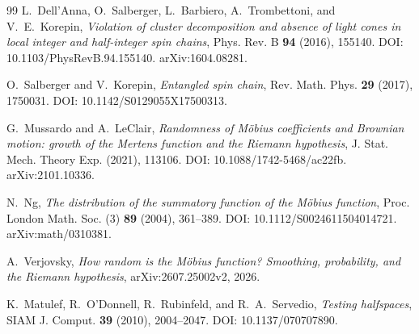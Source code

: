 \documentclass[11pt]{amsart}
\numberwithin{equation}{section}
\theoremstyle{plain}
\theoremstyle{definition}
\theoremstyle{remark}
\begin{document}
\begin{thebibliography}{99}
L.~Dell'Anna, O.~Salberger, L.~Barbiero, A.~Trombettoni, and V.~E.~Korepin,
\emph{Violation of cluster decomposition and absence of light cones in local integer and half-integer spin chains},
Phys. Rev. B \textbf{94} (2016), 155140.
DOI: 10.1103/PhysRevB.94.155140.
arXiv:1604.08281.

O.~Salberger and V.~Korepin,
\emph{Entangled spin chain},
Rev. Math. Phys. \textbf{29} (2017), 1750031.
DOI: 10.1142/S0129055X17500313.

G.~Mussardo and A.~LeClair,
\emph{Randomness of M\"obius coefficients and Brownian motion: growth of the Mertens function and the Riemann hypothesis},
J. Stat. Mech. Theory Exp. (2021), 113106.
DOI: 10.1088/1742-5468/ac22fb.
arXiv:2101.10336.

N.~Ng,
\emph{The distribution of the summatory function of the M\"obius function},
Proc. London Math. Soc. (3) \textbf{89} (2004), 361--389.
DOI: 10.1112/S0024611504014721.
arXiv:math/0310381.

A.~Verjovsky,
\emph{How random is the M\"obius function? Smoothing, probability, and the Riemann hypothesis},
arXiv:2607.25002v2, 2026.

K.~Matulef, R.~O'Donnell, R.~Rubinfeld, and R.~A.~Servedio,
\emph{Testing halfspaces},
SIAM J. Comput. \textbf{39} (2010), 2004--2047.
DOI: 10.1137/070707890.

\end{thebibliography}
\end{document}
